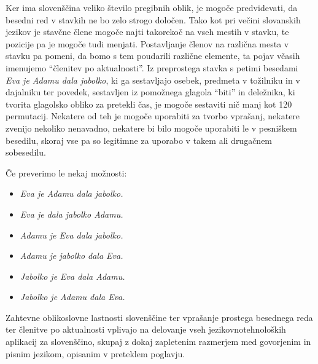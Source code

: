 \begin{multicols}{2}
Ker ima slovenščina veliko število pregibnih oblik, je mogoče predvidevati, da besedni red v stavkih ne bo zelo strogo določen. Tako kot pri večini slovanskih jezikov je stavčne člene mogoče najti takorekoč na vseh mestih v stavku, te pozicije pa je mogoče tudi menjati. Postav\-ljanje členov na različna mesta v stavku pa po\-meni, da bomo s tem poudarili različne elemente, ta pojav včasih imenujemo “členitev po aktualnosti”. Iz preprostega stavka s petimi besedami \textit{Eva je Adamu dala jabolko}, ki ga sestav\-ljajo osebek, predmeta v tožilniku in v dajalniku ter povedek, sestav\-ljen iz pomožnega glagola “biti” in deležnika, ki tvorita glagolsko obliko za pretekli čas, je mogoče sestaviti nič manj kot 120 permutacij. Nekatere od teh je mogoče uporabiti za tvorbo vprašanj, nekatere zvenijo nekoliko nenavadno, nekatere bi bilo mogoče uporabiti le v pesniškem besedilu, skoraj vse pa so legitimne za uporabo v takem ali drugačnem sobesedilu. 


Če preverimo le nekaj možnosti:

\begin{itemize}
\item \textit{Eva je Adamu dala jabolko.} 
\item \textit{Eva je dala jabolko Adamu.} 
\item \textit{Adamu je Eva dala jabolko.} 
\item \textit{Adamu je jabolko dala Eva.} 
\item \textit{Jabolko je Eva dala Adamu.} 
\item \textit{Jabolko je Adamu dala Eva.} 
\end{itemize}  

Zah\-tevne oblikoslovne lastnosti slovenščine ter vprašanje prostega besednega reda ter členitve po aktualnosti vplivajo na delovanje vseh jezikovnotehnoloških aplikacij za slovenščino, skupaj z dokaj zapletenim razmerjem med go\-vorjenim in pisnim jezikom, opisanim v preteklem poglavju.


\end{multicols}
